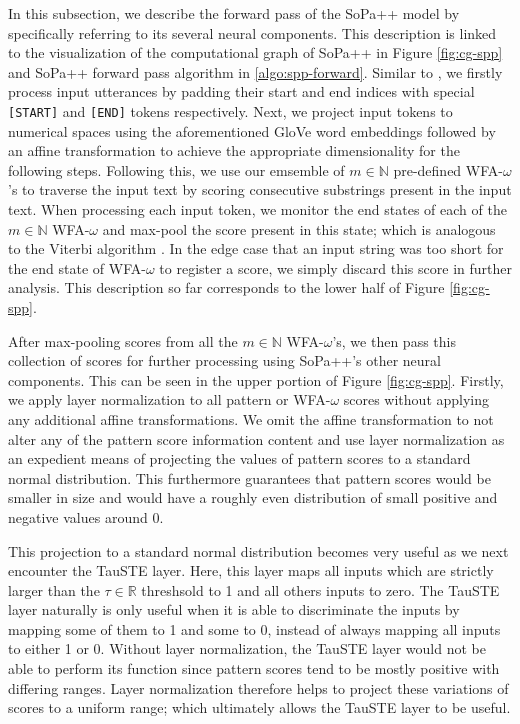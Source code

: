In this subsection, we describe the forward pass of the SoPa++ model by
specifically referring to its several neural components. This description is
linked to the visualization of the computational graph of SoPa++ in Figure
\ref{fig:cg-spp} and SoPa++ forward pass algorithm in \ref{algo:spp-forward}.
Similar to \citet{schwartz2018sopa}, we firstly process input utterances by
padding their start and end indices with special \texttt{[START]} and
\texttt{[END]} tokens respectively. Next, we project input tokens to numerical
spaces using the aforementioned GloVe word embeddings followed by an affine
transformation to achieve the appropriate dimensionality for the following
steps. Following this, we use our emsemble of $m \in \mathbb{N}$ pre-defined
WFA-$\omega$'s to traverse the input text by scoring consecutive substrings
present in the input text. When processing each input token, we monitor the end
states of each of the $m \in \mathbb{N}$ WFA-$\omega$ and max-pool the score
present in this state; which is analogous to the Viterbi algorithm
\citep{viterbi1967error}. In the edge case that an input string was too short
for the end state of WFA-$\omega$ to register a score, we simply discard this
score in further analysis. This description so far corresponds to the lower half
of Figure \ref{fig:cg-spp}.

After max-pooling scores from all the $m \in \mathbb{N}$ WFA-$\omega$'s, we
then pass this collection of scores for further processing using SoPa++'s other
neural components. This can be seen in the upper portion of Figure
\ref{fig:cg-spp}. Firstly, we apply layer normalization \citep{ba2016layer} to
all pattern or WFA-$\omega$ scores without applying any additional affine
transformations. We omit the affine transformation to not alter any of the
pattern score information content and use layer normalization as an expedient
means of projecting the values of pattern scores to a standard normal
distribution. This furthermore guarantees that pattern scores would be
smaller in size and would have a roughly even distribution of small positive and
negative values around 0.

This projection to a standard normal distribution becomes very useful as we next
encounter the TauSTE layer. Here, this layer maps all inputs which are strictly
larger than the $\tau \in \mathbb{R}$ threshsold to 1 and all others inputs to
zero. The TauSTE layer naturally is only useful when it is able to discriminate
the inputs by mapping some of them to 1 and some to 0, instead of always mapping
all inputs to either 1 or 0. Without layer normalization, the TauSTE layer would
not be able to perform its function since pattern scores tend to be mostly
positive with differing ranges. Layer normalization therefore helps to project
these variations of scores to a uniform range; which ultimately allows the
TauSTE layer to be useful.

